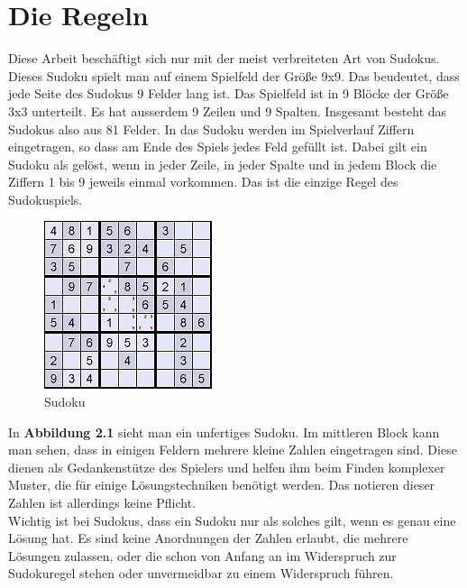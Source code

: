 \section{Die Regeln}
\label{Regeln}
Diese Arbeit beschäftigt sich nur mit der meist verbreiteten Art von Sudokus. Dieses Sudoku spielt man auf einem Spielfeld der Größe 9x9. Das beudeutet, dass jede Seite des Sudokus 9 Felder lang ist. Das Spielfeld ist in 9 Blöcke der Größe 3x3 unterteilt. Es hat ausserdem 9 Zeilen und 9 Spalten. Insgesamt besteht das Sudokus also aus 81 Felder. In das Sudoku werden im Spielverlauf Ziffern eingetragen, so dass am Ende des Spiels jedes Feld gefüllt ist. Dabei gilt ein Sudoku als gelöst, wenn in jeder Zeile, in jeder Spalte und in jedem Block die Ziffern 1 bis 9 jeweils einmal vorkommen. Das ist die einzige Regel des Sudokuspiels.\\

\begin{figure}[h]
\begin{center}
\includegraphics{./img/sudoku.jpg}
\caption{Sudoku}
\end{center}
\end{figure}

In \textbf{Abbildung 2.1} sieht man ein unfertiges Sudoku. Im mittleren Block kann man sehen, dass in einigen Feldern mehrere kleine Zahlen eingetragen sind. Diese dienen als Gedankenstütze des Spielers und helfen ihm beim Finden komplexer Muster, die für einige Lösungstechniken benötigt werden. Das notieren dieser Zahlen ist allerdings keine Pflicht.\\
Wichtig ist bei Sudokus, dass ein Sudoku nur als solches gilt, wenn es genau eine Lösung hat. Es sind keine Anordnungen der Zahlen erlaubt, die mehrere Lösungen zulassen, oder die schon von Anfang an im Widerspruch zur Sudokuregel stehen oder unvermeidbar zu einem Widerspruch führen.\\